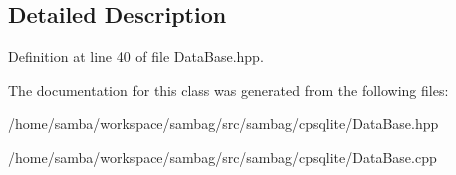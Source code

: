 \subsection{Detailed Description}


Definition at line 40 of file DataBase.hpp.



The documentation for this class was generated from the following files:\begin{DoxyCompactItemize}
\item 
/home/samba/workspace/sambag/src/sambag/cpsqlite/DataBase.hpp\item 
/home/samba/workspace/sambag/src/sambag/cpsqlite/DataBase.cpp\end{DoxyCompactItemize}
